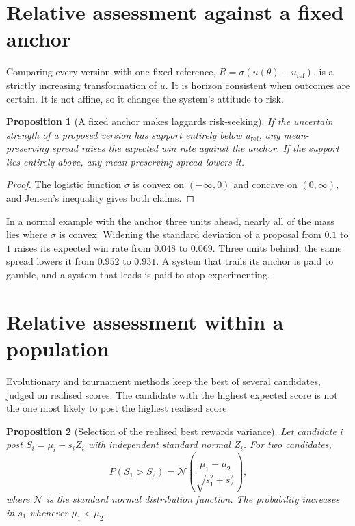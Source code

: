 \documentclass[11pt]{article}
\newtheorem{proposition}{Proposition}
\theoremstyle{definition}
\theoremstyle{remark}
\begin{document}
\section{Relative assessment against a fixed anchor}

Comparing every version with one fixed reference, $R=\sigma(u(\theta)-u_{\mathrm{ref}})$, is a
strictly increasing transformation of $u$. It is horizon consistent when outcomes are certain.
It is not affine, so it changes the system's attitude to risk.

\begin{proposition}[A fixed anchor makes laggards risk-seeking]\label{prop:anchor}
If the uncertain strength of a proposed version has support entirely below $u_{\mathrm{ref}}$,
any mean-preserving spread raises the expected win rate against the anchor. If the support lies
entirely above, any mean-preserving spread lowers it.
\end{proposition}

\begin{proof}
The logistic function $\sigma$ is convex on $(-\infty,0)$ and concave on $(0,\infty)$, and
Jensen's inequality gives both claims.
\end{proof}

In a normal example with the anchor three units ahead, nearly all of the mass lies where
$\sigma$ is convex. Widening the standard deviation of a proposal from $0.1$ to $1$ raises its
expected win rate from $0.048$ to $0.069$. Three units behind, the same spread
lowers it from $0.952$ to $0.931$. A system that trails its anchor is paid to gamble, and a
system that leads is paid to stop experimenting.

\section{Relative assessment within a population}

Evolutionary and tournament methods keep the best of several candidates, judged on realised
scores. The candidate with the highest expected score is not the one most likely to post the
highest realised score.

\begin{proposition}[Selection of the realised best rewards variance]\label{prop:variance}
Let candidate $i$ post $S_i=\mu_i+s_iZ_i$ with independent standard normal $Z_i$. For two
candidates,
\[
P(S_1>S_2)=\mathcal{N}\!\left(\frac{\mu_1-\mu_2}{\sqrt{s_1^2+s_2^2}}\right),
\]
where $\mathcal{N}$ is the standard normal distribution function. The probability increases
in $s_1$ whenever $\mu_1<\mu_2$.
\end{proposition}
\end{document}
